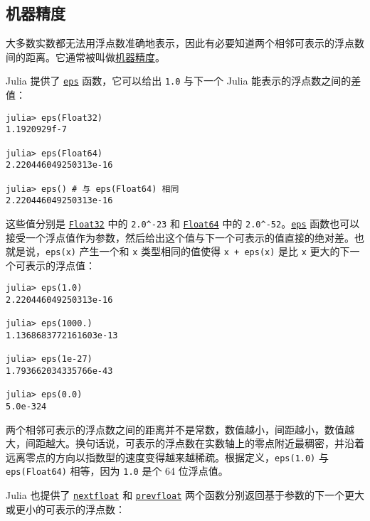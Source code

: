 \hypertarget{7614874233242990296}{}


\subsection{机器精度}



大多数实数都无法用浮点数准确地表示，因此有必要知道两个相邻可表示的浮点数间的距离。它通常被叫做\href{https://en.wikipedia.org/wiki/Machine\_epsilon}{机器精度}。



Julia 提供了 \hyperlink{4594213520310841636}{\texttt{eps}} 函数，它可以给出 \texttt{1.0} 与下一个 Julia 能表示的浮点数之间的差值：




\begin{verbatim}
julia> eps(Float32)
1.1920929f-7

julia> eps(Float64)
2.220446049250313e-16

julia> eps() # 与 eps(Float64) 相同
2.220446049250313e-16
\end{verbatim}



这些值分别是 \hyperlink{8101639384272933082}{\texttt{Float32}} 中的 \texttt{2.0{\textasciicircum}-23} 和 \hyperlink{5027751419500983000}{\texttt{Float64}} 中的 \texttt{2.0{\textasciicircum}-52}。\hyperlink{4594213520310841636}{\texttt{eps}} 函数也可以接受一个浮点值作为参数，然后给出这个值与下一个可表示的值直接的绝对差。也就是说，\texttt{eps(x)} 产生一个和 \texttt{x} 类型相同的值使得 \texttt{x + eps(x)} 是比 \texttt{x} 更大的下一个可表示的浮点值：




\begin{verbatim}
julia> eps(1.0)
2.220446049250313e-16

julia> eps(1000.)
1.1368683772161603e-13

julia> eps(1e-27)
1.793662034335766e-43

julia> eps(0.0)
5.0e-324
\end{verbatim}



两个相邻可表示的浮点数之间的距离并不是常数，数值越小，间距越小，数值越大，间距越大。换句话说，可表示的浮点数在实数轴上的零点附近最稠密，并沿着远离零点的方向以指数型的速度变得越来越稀疏。根据定义，\texttt{eps(1.0)} 与 \texttt{eps(Float64)} 相等，因为 \texttt{1.0} 是个 64 位浮点值。



Julia 也提供了 \hyperlink{8339500090035450608}{\texttt{nextfloat}} 和 \hyperlink{14035790731013288499}{\texttt{prevfloat}} 两个函数分别返回基于参数的下一个更大或更小的可表示的浮点数：




